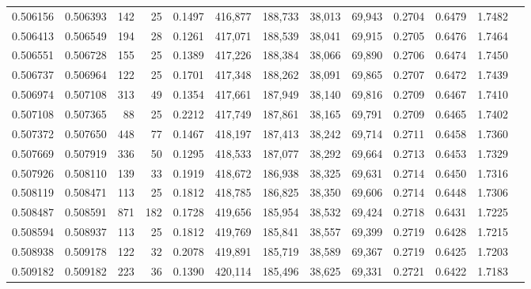 \begin{tabular}{rrrrrrrrrrrrr}
0.506156 & 0.506393 &   142 &  25 &                                     0.1497 & 416,877 & 188,733 &  38,013 &  69,943 & 0.2704 & 0.6479 & 1.7482 \\
0.506413 & 0.506549 &   194 &  28 &                                     0.1261 & 417,071 & 188,539 &  38,041 &  69,915 & 0.2705 & 0.6476 & 1.7464 \\
0.506551 & 0.506728 &   155 &  25 &                                     0.1389 & 417,226 & 188,384 &  38,066 &  69,890 & 0.2706 & 0.6474 & 1.7450 \\
0.506737 & 0.506964 &   122 &  25 &                                     0.1701 & 417,348 & 188,262 &  38,091 &  69,865 & 0.2707 & 0.6472 & 1.7439 \\
0.506974 & 0.507108 &   313 &  49 &                                     0.1354 & 417,661 & 187,949 &  38,140 &  69,816 & 0.2709 & 0.6467 & 1.7410 \\
0.507108 & 0.507365 &    88 &  25 &                                     0.2212 & 417,749 & 187,861 &  38,165 &  69,791 & 0.2709 & 0.6465 & 1.7402 \\
0.507372 & 0.507650 &   448 &  77 &                                     0.1467 & 418,197 & 187,413 &  38,242 &  69,714 & 0.2711 & 0.6458 & 1.7360 \\
0.507669 & 0.507919 &   336 &  50 &                                     0.1295 & 418,533 & 187,077 &  38,292 &  69,664 & 0.2713 & 0.6453 & 1.7329 \\
0.507926 & 0.508110 &   139 &  33 &                                     0.1919 & 418,672 & 186,938 &  38,325 &  69,631 & 0.2714 & 0.6450 & 1.7316 \\
0.508119 & 0.508471 &   113 &  25 &                                     0.1812 & 418,785 & 186,825 &  38,350 &  69,606 & 0.2714 & 0.6448 & 1.7306 \\
0.508487 & 0.508591 &   871 & 182 &                                     0.1728 & 419,656 & 185,954 &  38,532 &  69,424 & 0.2718 & 0.6431 & 1.7225 \\
0.508594 & 0.508937 &   113 &  25 &                                     0.1812 & 419,769 & 185,841 &  38,557 &  69,399 & 0.2719 & 0.6428 & 1.7215 \\
0.508938 & 0.509178 &   122 &  32 &                                     0.2078 & 419,891 & 185,719 &  38,589 &  69,367 & 0.2719 & 0.6425 & 1.7203 \\
0.509182 & 0.509182 &   223 &  36 &                                     0.1390 & 420,114 & 185,496 &  38,625 &  69,331 & 0.2721 & 0.6422 & 1.7183 \\

\end{tabular}
